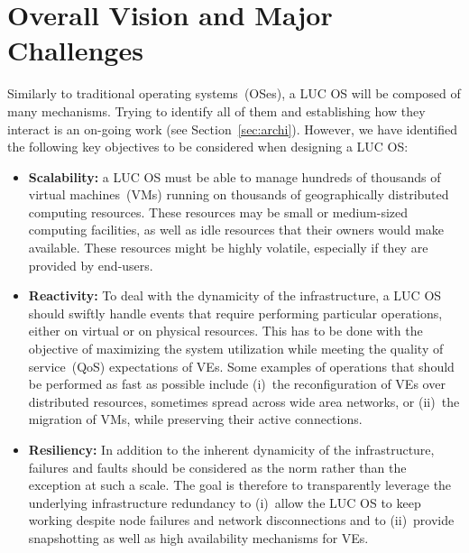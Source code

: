 \section{Overall Vision and Major Challenges\label{sec:challenges}}

Similarly to traditional operating systems~(OSes), a LUC OS will be composed of
many mechanisms. Trying to identify all of them and establishing how they
interact is an on-going work (see Section~\ref{sec:archi}). However,
we have identified the following
key objectives to be considered when designing a LUC OS:

\begin{itemize} 
\item \textbf{Scalability:} a LUC OS must be able to manage hundreds of thousands of virtual
  machines~(VMs) running on thousands of geographically distributed computing resources.
  These resources may be small or medium-sized computing facilities, as well as idle
  resources that their owners would make available. These resources might be highly
  volatile, especially if they are provided by end-users.
\item \textbf{Reactivity:} To deal with the dynamicity of the infrastructure, a LUC OS
  should swiftly handle events that require performing particular operations, either on
  virtual or on physical resources. This has to be done with the objective of maximizing
  the system utilization while meeting the quality of service~(QoS) expectations of VEs.
  Some examples of operations that should be performed as fast as possible include (i)~the
  reconfiguration of VEs over distributed resources, sometimes spread across wide area
  networks, or (ii)~the migration of VMs, while preserving their active connections.
\item \textbf{Resiliency:} In addition to the inherent dynamicity of the infrastructure,
  failures and faults should be considered as the norm rather than the exception at such a
  scale. The goal is therefore to transparently leverage the underlying infrastructure
  redundancy to (i)~allow the LUC OS to keep working despite node failures and network
  disconnections and to (ii)~provide snapshotting as well as high availability mechanisms
  for VEs.



\end{itemize}
